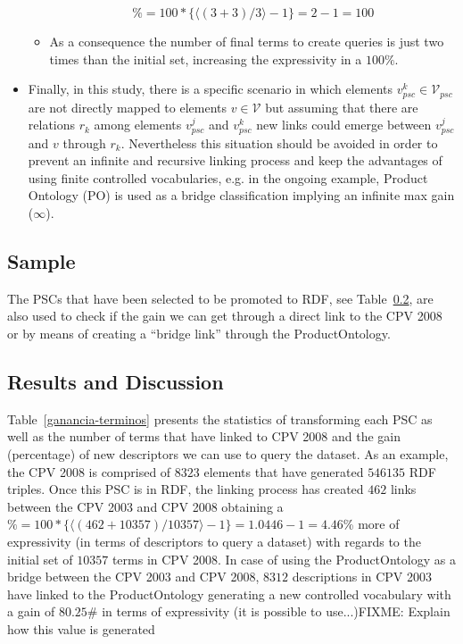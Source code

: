 \begin{itemize}
\begin{itemize}
  \begin{equation}
      \% = 100 * \{ \langle (3+3) / 3 \rangle -1 \} = 2-1 = 100 
  \end{equation}
      \item As a consequence the number of final terms to create queries is just two times than the initial set, increasing the expressivity in a $100\%$.
  \end{itemize}

 \item Finally, in this study, there is a specific scenario in which elements $v^k_{psc} \in \mathcal{V}_{psc}$ are not directly mapped to elements $v \in \mathcal{V}$ but 
 assuming that there are relations $r_k$  among elements $v^j_{psc}$  and $v^k_{psc}$ new links could emerge between $v^j_{psc}$ and $v$ through $r_k$. Nevertheless this 
 situation should be avoided in order to prevent an infinite and recursive linking process and keep the advantages of using finite controlled vocabularies, 
 e.g. in the ongoing example, Product Ontology (PO) is used as a bridge classification implying an infinite max gain ($\infty$).
 
\end{itemize}

\subsection{Sample}
The PSCs that have been selected to be promoted to RDF, see Table~\ref{}, are also used to check if the gain we can get through a direct link to the CPV 2008 or 
by means of creating a ``bridge link'' through the ProductOntology.

 

\subsection{Results and Discussion}
Table~\ref{ganancia-terminos} presents the statistics of transforming each PSC as well as the number of terms that have linked to CPV 2008 and the gain (percentage) of 
new descriptors we can use to query the dataset. As an example, the CPV 2008 is comprised of $8323$ elements that have generated $546135$ RDF triples. 
Once this PSC is in RDF, the linking process has created $462$ links between the CPV 2003 and CPV 2008 obtaining a $\% = 100 * \{ \langle (462+10357) / 10357 \rangle -1 \} = 1.0446-1 = 4.46$\% more 
of expressivity (in terms of descriptors to query a dataset) with regards to the initial set of $10357$ terms in CPV 2008. In case of using the ProductOntology as a bridge 
between the CPV 2003 and CPV 2008, $8312$ descriptions in CPV 2003 have linked to the ProductOntology generating a new controlled vocabulary with a 
gain of $80.25$\# in terms of expressivity (it is possible to use...)FIXME: Explain how this value is generated


